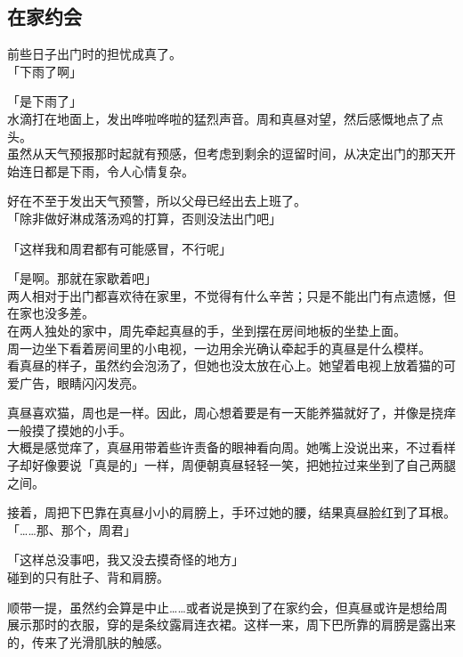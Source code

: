 \subsection{在家约会}

前些日子出门时的担忧成真了。\\

「下雨了啊」

「是下雨了」\\

水滴打在地面上，发出哗啦哗啦的猛烈声音。周和真昼对望，然后感慨地点了点头。\\

虽然从天气预报那时起就有预感，但考虑到剩余的逗留时间，从决定出门的那天开始连日都是下雨，令人心情复杂。

好在不至于发出天气预警，所以父母已经出去上班了。\\

「除非做好淋成落汤鸡的打算，否则没法出门吧」

「这样我和周君都有可能感冒，不行呢」

「是啊。那就在家歇着吧」\\

两人相对于出门都喜欢待在家里，不觉得有什么辛苦；只是不能出门有点遗憾，但在家也没多差。\\

在两人独处的家中，周先牵起真昼的手，坐到摆在房间地板的坐垫上面。\\

周一边坐下看着房间里的小电视，一边用余光确认牵起手的真昼是什么模样。\\

看真昼的样子，虽然约会泡汤了，但她也没太放在心上。她望着电视上放着猫的可爱广告，眼睛闪闪发亮。

真昼喜欢猫，周也是一样。因此，周心想着要是有一天能养猫就好了，并像是挠痒一般摸了摸她的小手。\\

大概是感觉痒了，真昼用带着些许责备的眼神看向周。她嘴上没说出来，不过看样子却好像要说「真是的」一样，周便朝真昼轻轻一笑，把她拉过来坐到了自己两腿之间。

接着，周把下巴靠在真昼小小的肩膀上，手环过她的腰，结果真昼脸红到了耳根。\\

「……那、那个，周君」

「这样总没事吧，我又没去摸奇怪的地方」\\

碰到的只有肚子、背和肩膀。

顺带一提，虽然约会算是中止……或者说是换到了在家约会，但真昼或许是想给周展示那时的衣服，穿的是条纹露肩连衣裙。这样一来，周下巴所靠的肩膀是露出来的，传来了光滑肌肤的触感。\\

